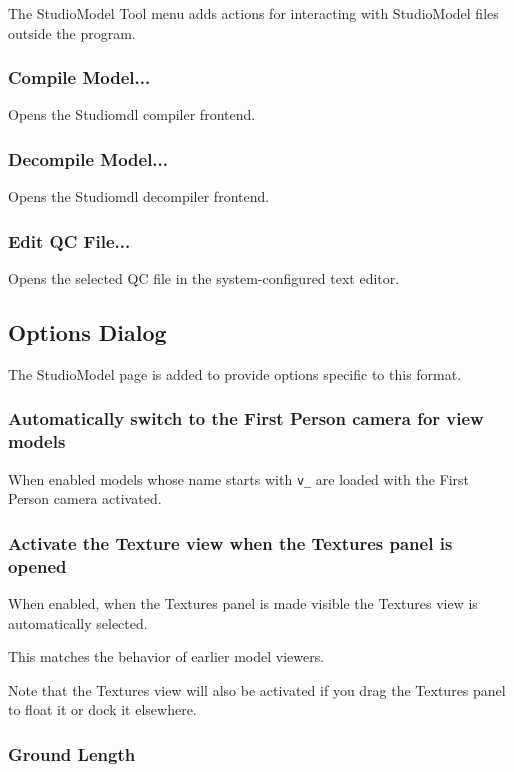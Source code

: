 \documentclass[10pt, a4paper, titlepage, oneside]{article}
\newcommand{\code}[1]{\mbox{\texttt{#1}}}
\begin{document}
The StudioModel Tool menu adds actions for interacting with StudioModel files outside the program.

\subsubsection{Compile Model...}

Opens the Studiomdl compiler frontend.

\subsubsection{Decompile Model...}

Opens the Studiomdl decompiler frontend.

\subsubsection{Edit QC File...}

Opens the selected QC file in the system-configured text editor.

\newpage

\subsection{Options Dialog}

The StudioModel page is added to provide options specific to this format.

\subsubsection{Automatically switch to the First Person camera for view models}

When enabled models whose name starts with \code{v\_} are loaded with the First Person camera activated.

\subsubsection{Activate the Texture view when the Textures panel is opened}

When enabled, when the Textures panel is made visible the Textures view is automatically selected.

This matches the behavior of earlier model viewers.

Note that the Textures view will also be activated if you drag the Textures panel to float it or dock it elsewhere.

\subsubsection{Ground Length}
\end{document}
